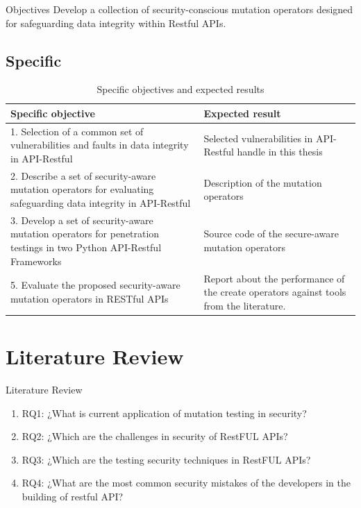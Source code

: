 \documentclass[10pt]{beamer}
\theoremstyle{remark}
\theoremstyle{definition}
\begin{document}
\begin{frame}{Objectives}
Develop a collection of security-conscious mutation operators designed for safeguarding data integrity within Restful APIs.
\subsection{Specific}

\begin{table}[H]
    \centering
    \begin{tabular}{|p{}|p{}|}
        \hline
         \textbf{Specific objective} & \textbf{Expected result} \\ \hline
         1.  Selection of a common set of vulnerabilities and faults in data integrity in API-Restful &   Selected vulnerabilities in API-Restful handle in this thesis  \\  \hline
         2. Describe a set of security-aware mutation operators for evaluating safeguarding data integrity in API-Restful & Description of the mutation operators \\  \hline
         3. Develop a set of security-aware mutation operators for penetration testings in two Python API-Restful Frameworks & Source code of the secure-aware mutation operators \\  \hline
         5. Evaluate the proposed security-aware mutation operators in RESTful APIs & Report about the performance of the create operators against tools from the literature.
         \\ \hline
    \end{tabular}
    \caption{Specific objectives and expected results}
    \label{tab:objetivos}
\end{table}

\end{frame}

\section{Literature Review}

\begin{frame}{Literature Review}
\begin{enumerate}
    \item RQ1: ¿What is current application of mutation testing in security?
    \item RQ2: ¿Which are the challenges in security of RestFUL APIs?
    \item RQ3: ¿Which are the testing  security techniques in RestFUL APIs?
    \item RQ4: ¿What are the most common security mistakes of the developers in the building of restful API?
\end{enumerate}
\end{frame}
\end{document}

